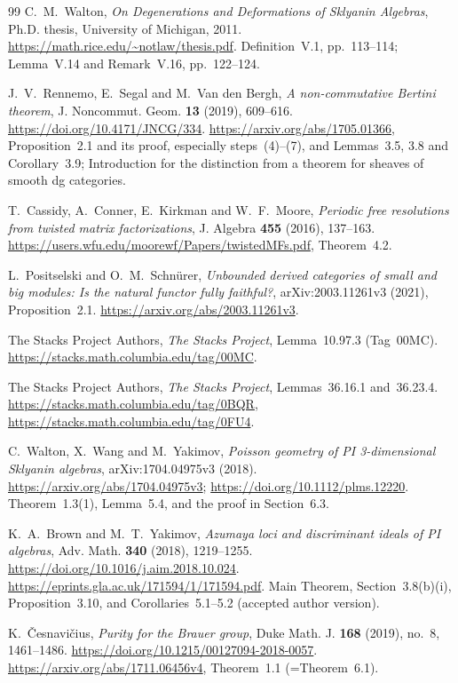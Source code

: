 \begin{thebibliography}{99}
C.~M.~Walton,
\emph{On Degenerations and Deformations of Sklyanin Algebras},
Ph.D. thesis, University of Michigan, 2011.
\url{https://math.rice.edu/~notlaw/thesis.pdf}.
Definition~V.1, pp.~113--114; Lemma~V.14 and Remark~V.16,
pp.~122--124.

J.~V.~Rennemo, E.~Segal and M.~Van den Bergh,
\emph{A non-commutative Bertini theorem},
J. Noncommut. Geom. \textbf{13} (2019), 609--616.
\url{https://doi.org/10.4171/JNCG/334}.
\url{https://arxiv.org/abs/1705.01366}, Proposition~2.1 and its proof,
especially steps~(4)--(7), and Lemmas~3.5, 3.8 and Corollary~3.9;
Introduction for the distinction from a theorem for sheaves of smooth dg categories.

T.~Cassidy, A.~Conner, E.~Kirkman and W.~F.~Moore,
\emph{Periodic free resolutions from twisted matrix factorizations},
J. Algebra \textbf{455} (2016), 137--163.
\url{https://users.wfu.edu/moorewf/Papers/twistedMFs.pdf}, Theorem~4.2.

L.~Positselski and O.~M.~Schn\"urer,
\emph{Unbounded derived categories of small and big modules:
Is the natural functor fully faithful?},
arXiv:2003.11261v3 (2021), Proposition~2.1.
\url{https://arxiv.org/abs/2003.11261v3}.

The Stacks Project Authors,
\emph{The Stacks Project}, Lemma~10.97.3 (Tag~00MC).
\url{https://stacks.math.columbia.edu/tag/00MC}.

The Stacks Project Authors,
\emph{The Stacks Project}, Lemmas~36.16.1 and~36.23.4.
\url{https://stacks.math.columbia.edu/tag/0BQR},
\url{https://stacks.math.columbia.edu/tag/0FU4}.


C.~Walton, X.~Wang and M.~Yakimov,
\emph{Poisson geometry of PI 3-dimensional Sklyanin algebras},
arXiv:1704.04975v3 (2018).
\url{https://arxiv.org/abs/1704.04975v3};
\url{https://doi.org/10.1112/plms.12220}.
Theorem~1.3(1), Lemma~5.4, and the proof in Section~6.3.

K.~A.~Brown and M.~T.~Yakimov,
\emph{Azumaya loci and discriminant ideals of PI algebras},
Adv. Math. \textbf{340} (2018), 1219--1255.
\url{https://doi.org/10.1016/j.aim.2018.10.024}.
\url{https://eprints.gla.ac.uk/171594/1/171594.pdf}.
Main Theorem, Section~3.8(b)(i), Proposition~3.10,
and Corollaries~5.1--5.2 (accepted author version).

K.~\v{C}esnavi\v{c}ius,
\emph{Purity for the Brauer group},
Duke Math. J. \textbf{168} (2019), no.~8, 1461--1486.
\url{https://doi.org/10.1215/00127094-2018-0057}.
\url{https://arxiv.org/abs/1711.06456v4},
Theorem~1.1 (=Theorem~6.1).


\end{thebibliography}
